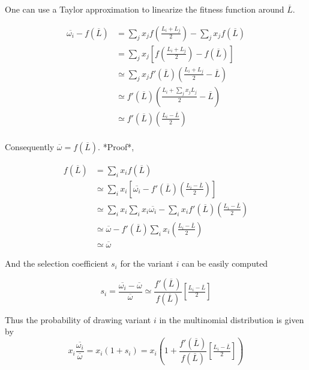 \documentclass{article}
\begin{document}
One can use a Taylor approximation to linearize the fitness function around $\overline{L}$.  

\begin{equation}
  \begin{aligned}
    \overline{\omega_i} - f(\overline{L}) &=
    \sum_j x_j f \left( \tfrac{L_i + L_j}{2} \right) - \sum_j x_j f(\overline{L}) \\
    &=
    \sum_j x_j  \left[ f \left( \tfrac{L_i + L_j}{2} \right) - f(\overline{L}) \right] \\
    &\simeq
    \sum_j x_j  f'(\overline{L}) \left( \tfrac{L_i + L_j}{2} - \overline{L} \right) \\
    &\simeq
     f'(\overline{L}) \left( \tfrac{L_i + \sum_j x_j L_j}{2} - \overline{L} \right) \\
     &\simeq
     f'(\overline{L}) \left( \tfrac{L_i - \overline{L}}{2}\right) \\
  \end{aligned}
\end{equation}

Consequently $\overline{\omega} = f(\overline{L})$. *Proof*,

\begin{equation}
  \begin{aligned}
    f(\overline{L}) &= \sum_i x_i f(\overline{L}) \\
    &\simeq \sum_i x_i \left[ \overline{\omega_i} - f'(\overline{L}) \left( \tfrac{L_i - \overline{L}}{2}\right) \right] \\
    &\simeq
    \sum_i x_i \sum_i x_i \overline{\omega_i} - \sum_i x_i f'(\overline{L}) \left( \tfrac{L_i - \overline{L}}{2}\right) \\
    &\simeq
     \overline{\omega} - f'(\overline{L}) \sum_i x_i \left( \tfrac{L_i - \overline{L}}{2}\right) \\
    &\simeq
     \overline{\omega}
  \end{aligned}
\end{equation}

And the selection coefficient $s_i$ for the variant $i$ can be easily computed  

\begin{equation}
    s_i = \dfrac{\overline{\omega_i} - \overline{\omega}}{\overline{\omega}}
    \simeq  \dfrac{f'(\overline{L})}{f(\overline{L})} \left[ \tfrac{L_i - \overline{L}}{2} \right]
\end{equation}

Thus the probability of drawing variant $i$ in the multinomial distribution is given by 
\begin{equation}
    x_i \dfrac{\overline{\omega_i}}{\overline{\omega}} = 
     x_i (1 + s_i) =  x_i \left(1 +  \dfrac{f'(\overline{L})}{f(\overline{L})} \left[ \tfrac{L_i - \overline{L}}{2} \right] \right)
\end{equation}
\end{document}
